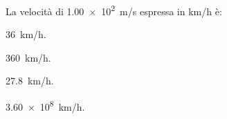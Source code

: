 \documentclass{article}
\begin{document}
\begin{enumext}[columns=2,save-ans=sabastiano,labelsep=1cm, show-ans=true]
 \item La velocità di \SI{1,00e2}{m/s} espressa in \si{km/h} è:
   \begin{keyans*}
     \item \SI{36}{km/h}.
     \item* \SI{360}{km/h}.
     \item \SI{27,8}{km/h}.
     \item \SI{3,60e8}{km/h}. \miniright

   \end{keyans*}
\end{enumext}

\stop



\end{document}
